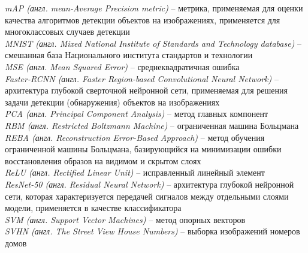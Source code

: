 \textit{mAP (англ. mean-Average Precision metric)} -- метрика, применяемая для оценки качества алгоритмов детекции объектов на изображениях, применяется для многоклассовых случаев детекции\\
\textit{MNIST (англ. Mixed National Institute of Standards and Technology database)} -- смешанная база Национального института стандартов и технологии\\
\textit{MSE (англ. Mean Squared Error)} -- среднеквадратичная ошибка\\
\textit{Faster-RCNN (англ. Faster Region-based Convolutional Neural Network)} -- архитектура глубокой сверточной нейронной сети, применяемая для решения задачи детекции (обнаружения) объектов на изображениях\\
\textit{PCA (англ. Principal Component Analysis)} -- метод главных компонент\\
\textit{RBM (англ. Restricted Boltzmann Machine)} -- ограниченная машина Больцмана\\
\textit{REBA (англ. Reconstruction Error-Based Approach)} -- метод обучения ограниченной машины Больцмана, базирующийся на минимизации ошибки восстановления образов на видимом и скрытом слоях\\
\textit{ReLU (англ. Rectified Linear Unit)} -- исправленный линейный элемент\\
\textit{ResNet-50 (англ. Residual Neural Network)} -- архитектура глубокой нейронной сети, которая характеризуется передачей сигналов между отдельными слоями модели, применяется в качестве классификатора\\
\textit{SVM (англ. Support Vector Machines)} -- метод опорных векторов\\
\textit{SVHN (англ. The Street View House Numbers)} -- выборка изображений номеров домов





